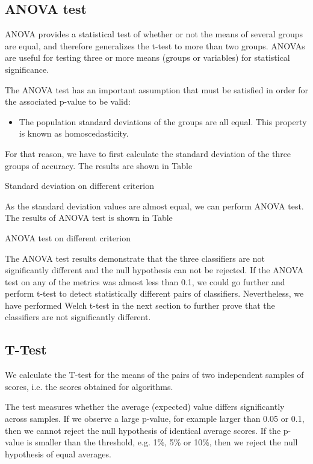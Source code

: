 \subsection{ANOVA test}
 ANOVA provides a statistical test of whether or not the means of several groups are equal, and therefore generalizes the t-test to more than two groups. ANOVAs are useful for testing three or more means (groups or variables) for statistical significance.

The ANOVA test has an important assumption that must be satisfied in order for the associated p-value to be valid:
\begin{itemize}
	\item The population standard deviations of the groups are all equal. This property is known as homoscedasticity.
\end{itemize}

For that reason, we have to first calculate the standard deviation of the three groups of accuracy. The results are shown in Table

\begin{table}
	\centering
	\caption{Standard deviation on different criterion}
	\label{tab:std}
\end{table}

As the standard deviation values are almost equal, we can perform ANOVA test. The results of ANOVA test is shown in Table

\begin{table}
	\centering
	\caption{ANOVA test on different criterion}
	\label{tab:anova}
\end{table}

The ANOVA test results demonstrate that the three classifiers are not significantly different and the null hypothesis can not be rejected. If the ANOVA test on any of the metrics was almost less than 0.1, we could go further and perform t-test to detect statistically different pairs of classifiers. Nevertheless, we have performed Welch t-test in the next section to further prove that the classifiers are not significantly different.

\subsection{T-Test}
We calculate the T-test for the means of the pairs of two independent samples of scores, i.e. the scores obtained for algorithms.

The test measures whether the average (expected) value differs significantly across samples. If we observe a large p-value, for example larger than 0.05 or 0.1, then we cannot reject the null hypothesis of identical average scores. If the p-value is smaller than the threshold, e.g. 1\%, 5\% or 10\%, then we reject the null hypothesis of equal averages.

